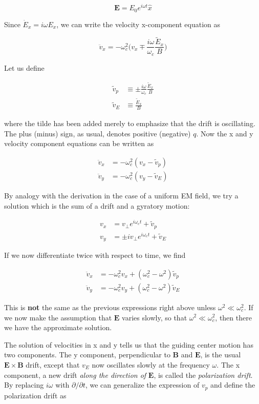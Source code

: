\documentclass[
  notoc %
]{tufte-book}
\begin{document}
\[
\mathbf{E} = E_0 e^{i\omega t}\widehat{x}
\]

Since \(\dot{E}_x = i\omega E_x\), we can write the velocity x-component
equation as

\[
\ddot{v}_x = -\omega_c^2 \Big( v_x \mp \frac{i\omega}{\omega_c}\frac{\tilde{E}_x}{B} \Big)
\]

Let us define

\[
\begin{aligned}
\tilde{v}_p &\equiv \pm \frac{i\omega}{\omega_c}\frac{\tilde{E}_x}{B} \\
\tilde{v}_E &\equiv \frac{\tilde{E}_x}{B}
\end{aligned}
\]

where the tilde has been added merely to emphasize that the drift is
oscillating. The plus (minus) sign, as usual, denotes positive
(negative) \(q\). Now the x and y velocity component equations can be
written as

\[
\begin{aligned}
\ddot{v}_x &= -\omega_c^2(v_x - \tilde{v}_p) \\
\ddot{v}_y &= -\omega_c^2(v_y - \tilde{v}_E)
\end{aligned}
\]

By analogy with the derivation in the case of a uniform EM field, we try
a solution which is the sum of a drift and a gyratory motion:

\[
\begin{aligned}
v_x &= v_\perp e^{i\omega_c t} + \tilde{v}_p \\
v_y &= \pm i v_\perp e^{i\omega_c t} + \tilde{v}_E
\end{aligned}
\]

If we now differentiate twice with respect to time, we find

\[
\begin{aligned}
\ddot{v}_x &= -\omega_c^2 v_x + (\omega_c^2 - \omega^2)\tilde{v}_p \\
\ddot{v}_y &= -\omega_c^2 v_y + (\omega_c^2 - \omega^2)\tilde{v}_E
\end{aligned}
\]

This is \textbf{not} the same as the previous expressions right above
unless \(\omega^2 \ll \omega_c^2\). If we now make the assumption that
\(\mathbf{E}\) varies slowly, so that \(\omega^2 \ll \omega_c^2\), then
there we have the approximate solution.

The solution of velocities in x and y tells us that the guiding center
motion has two components. The y component, perpendicular to
\(\mathbf{B}\) and \(\mathbf{E}\), is the usual
\(\mathbf{E}\times\mathbf{B}\) drift, except that \(v_E\) now oscillates
slowly at the frequency \(\omega\). The x component, a new drift
\emph{along the direction of} \(\mathbf{E}\), is called the
\emph{polarization drift}. By replacing \(i\omega\) with
\(\partial/\partial t\), we can generalize the expression of \(v_p\) and
define the polarization drift as
\end{document}
